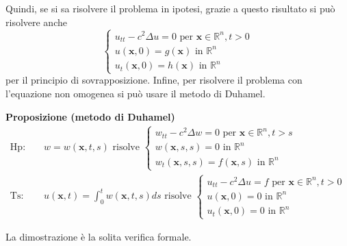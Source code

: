 \documentclass{article}
\begin{document}
Quindi, se si sa risolvere il problema in ipotesi, grazie a questo risultato
si pu\`{o} risolvere anche 
\begin{equation*}
\left\{ 
\begin{array}{c}
u_{tt}-c^{2}\Delta u=0\text{ per }\mathbf{x}\in 
\mathbb{R}
^{n},t>0 \\ 
u\left( \mathbf{x},0\right) =g\left( \mathbf{x}\right) \text{ in }%
\mathbb{R}
^{n} \\ 
u_{t}\left( \mathbf{x},0\right) =h\left( \mathbf{x}\right) \text{ in }%
\mathbb{R}
^{n}%
\end{array}%
\right.
\end{equation*}
per il principio di sovrapposizione. Infine, per risolvere il
problema con l'equazione non omogenea si pu\`{o} usare il metodo di Duhamel.

\textbf{Proposizione (metodo di Duhamel)}%
\begin{eqnarray*}
\text{Hp}\text{: } &&w=w\left( \mathbf{x},t,s\right) \text{ risolve }\left\{ 
\begin{array}{c}
w_{tt}-c^{2}\Delta w=0\text{ per }\mathbf{x}\in 
\mathbb{R}
^{n},t>s \\ 
w\left( \mathbf{x},s,s\right) =0\text{ in }%
\mathbb{R}
^{n} \\ 
w_{t}\left( \mathbf{x},s,s\right) =f\left( \mathbf{x},s\right) \text{ in }%
\mathbb{R}
^{n}%
\end{array}%
\right. \\
\text{Ts}\text{: } &&u\left( \mathbf{x},t\right) =\int_{0}^{t}w\left( 
\mathbf{x},t,s\right) ds\text{ risolve }\left\{ 
\begin{array}{c}
u_{tt}-c^{2}\Delta u=f\text{ per }\mathbf{x}\in 
\mathbb{R}
^{n},t>0 \\ 
u\left( \mathbf{x},0\right) =0\text{ in }%
\mathbb{R}
^{n} \\ 
u_{t}\left( \mathbf{x},0\right) =0\text{ in }%
\mathbb{R}
^{n}%
\end{array}%
\right.
\end{eqnarray*}

La dimostrazione \`{e} la solita verifica formale.
\end{document}
